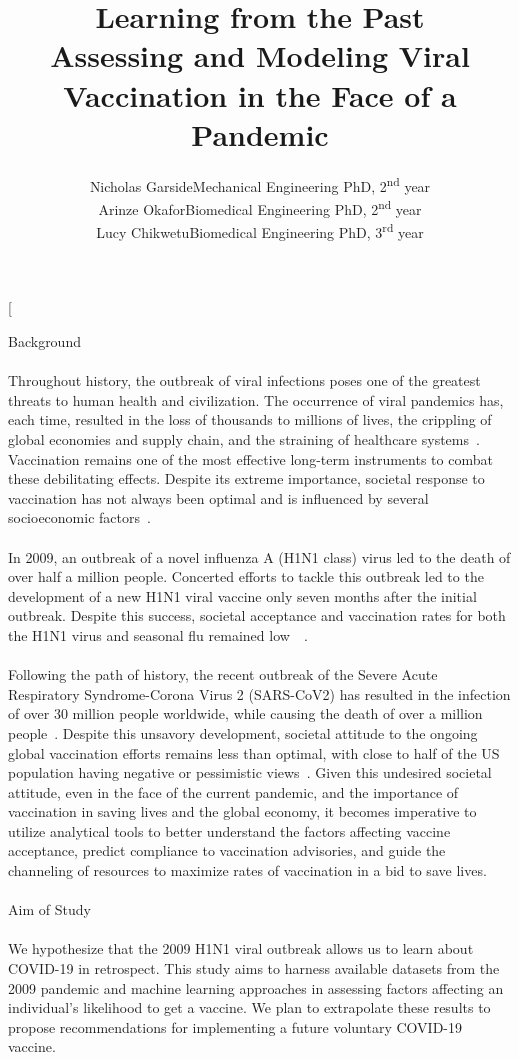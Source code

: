 \documentclass{IEEEtran}
\title{Learning from the Past \\{\large Assessing and Modeling Viral Vaccination in the Face of a Pandemic}}
\author{\small Nicholas Garside\textemdash Mechanical Engineering PhD, 2\textsuperscript{nd} year \\
Arinze Okafor\textemdash Biomedical Engineering PhD, 2\textsuperscript{nd} year \\
 Lucy Chikwetu\textemdash Biomedical Engineering PhD, 3\textsuperscript{rd} year  }
\begin{document}
\twocolumn[
\begin{@twocolumnfalse}
\maketitle
{\huge Background}\\\\
Throughout history, the outbreak of viral infections poses one of the greatest threats to human health and civilization. The occurrence of viral pandemics has, each time, resulted in the loss of thousands to millions of lives, the crippling of global economies and supply chain, and the straining of healthcare systems~\cite{HuremoviA2019}. Vaccination remains one of the most effective long-term instruments to combat these debilitating effects. Despite its extreme importance, societal response to vaccination has not always been optimal and is influenced by several socioeconomic factors~\cite{youngVax}.\\\\
In 2009, an outbreak of a novel influenza A (H1N1 class) virus led to the death of over half a million people. Concerted efforts to tackle this outbreak led to the development of a new H1N1 viral vaccine only seven months after the initial outbreak. Despite this success, societal acceptance and vaccination rates for both the H1N1 virus and seasonal flu remained low~\cite{ravert_fu_zimet_2012}~\cite{cdc}.\\\\ 
Following the path of history, the recent outbreak of the Severe Acute Respiratory Syndrome-Corona Virus 2 (SARS-CoV2) has resulted in the infection of over 30 million people worldwide, while causing the death of over a million people~\cite{jhu}. Despite this unsavory development, societal attitude to the ongoing global vaccination efforts remains less than optimal, with close to half of the US population having negative or pessimistic views~\cite{fisher}. Given this undesired societal attitude, even in the face of the current pandemic, and the importance of vaccination in saving lives and the global economy, it becomes imperative to utilize analytical tools to better understand the factors affecting vaccine acceptance, predict compliance to vaccination advisories, and guide the channeling of resources to maximize rates of vaccination in a bid to save lives.\\\\ 
{\huge Aim of Study}\\\\
We hypothesize that the 2009 H1N1 viral outbreak allows us to learn about COVID-19 in retrospect.  This study aims to harness available datasets from the 2009 pandemic and machine learning approaches in assessing factors affecting an individual's likelihood to get a vaccine. We plan to extrapolate these results to propose recommendations for implementing a future voluntary COVID-19 vaccine.\\\\ 

\end{@twocolumnfalse}
\end{document}
